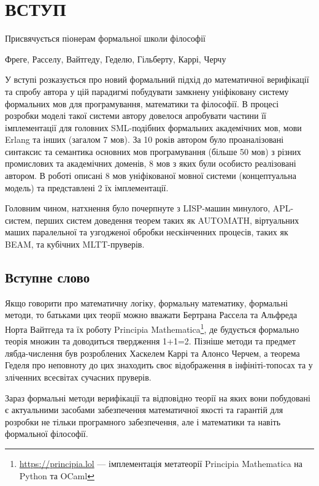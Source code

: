 \chapter*{ВСТУП}
\epigraph{Присвячується піонерам формальної школи філософії}{Фреге, Расселу, Вайтгеду, Геделю, Гільберту, Каррі, Черчу}

У вступі розказується про новий формальний підхід до математичної верифікації та спробу автора
у цій парадигмі побудувати замкнену уніфіковану систему формальних мов для
програмування, математики та філософії. В процесі розробки моделі такої системи автору
довелося апробувати частини її імплементації для головних SML-подібних формальних академічних мов,
мови Erlang та інших (загалом 7 мов). За 10 років автором було проаналізовані
синтаксис та семантика основних мов програмування (більше 50 мов) з різних промислових
та академічних доменів, 8 мов з яких були особисто реалізовані автором. В роботі
описані 8 мов уніфікованої мовної системи (концептуальна модель) та представлені 2 їх імплементації.

Головним чином, натхнення було почерпнуте з LISP-машин минулого, APL-систем,
перших систем доведення теорем таких як AUTOMATH, віртуальних маших паралельної
та узгодженої обробки нескінченних процесів, таких як BEAM, та кубічних MLTT-пруверів.

\section*{Вступне слово}
Якщо говорити про математичну логіку, формальну математику, формальні методи,
то батьками цих теорії можно вважати Бертрана Рассела та Альфреда Норта Вайтгеда та їх роботу
Principia Mathematica\footnote{\url{https://principia.lol} --- імплементація метатеорії Principia Mathematica на Python та OCaml},
де будується формально теорія множин та доводиться твердження 1+1=2. Пізніше методи та предмет
лябда-числення був розроблених Хаскелем Каррі та Алонсо Черчем, а теорема Геделя про неповноту до цих
знаходить своє відображення в інфініті-топосах та у зліченних всесвітах сучасних пруверів.

Зараз формальні методи верифікації та відповідно теорії на яких вони побудовані
є актуальними засобами забезпечення математичної якості та гарантій для розробки не тільки
програмного забезпечення, але і математики та навіть формальної філософії.

